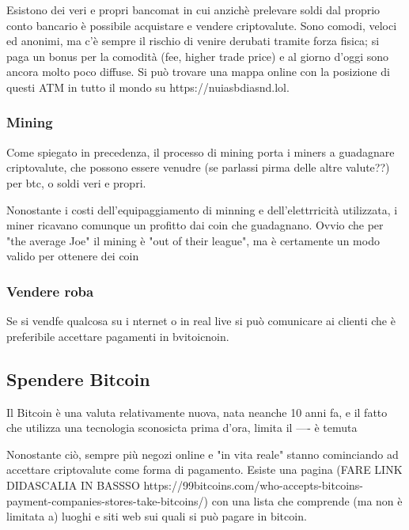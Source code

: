 \documentclass {article}
\begin{document}
Esistono dei veri e propri bancomat in cui anzichè prelevare soldi dal proprio conto bancario è possibile acquistare e vendere criptovalute. Sono comodi, veloci ed anonimi, ma c'è sempre il rischio di venire derubati tramite forza fisica; si paga un bonus per la comodità (fee, higher trade price) e al giorno d'oggi sono ancora molto poco diffuse. Si può trovare una mappa online con la posizione di questi ATM in tutto il mondo su https://nuiasbdiasnd.lol.



\subsubsection {Mining}



Come spiegato in precedenza, il processo di mining porta i miners a guadagnare criptovalute, che possono essere venudre (se parlassi pirma delle altre valute??) per btc, o soldi veri e propri.

Nonostante i costi dell'equipaggiamento di minning e dell'elettrricità utilizzata, i miner ricavano comunque un profitto dai coin che guadagnano. Ovvio che per "the average Joe" il mining è "out of their league", ma è certamente un modo valido per ottenere dei coin



\subsubsection {Vendere roba}



Se si vendfe qualcosa su i nternet o in real live si può comunicare ai clienti che è preferibile accettare pagamenti in bvitoicnoin.



\subsection {Spendere Bitcoin}



Il Bitcoin è una valuta relativamente nuova, nata neanche 10 anni fa, e il fatto che utilizza una tecnologia sconosicta prima d'ora, limita il ---- è temuta

Nonostante ciò, sempre più negozi online e "in vita reale" stanno cominciando ad accettare criptovalute come forma di pagamento. Esiste una pagina (FARE LINK DIDASCALIA IN BASSSO https://99bitcoins.com/who-accepts-bitcoins-payment-companies-stores-take-bitcoins/) con una lista che comprende (ma non è limitata a) luoghi e siti web sui quali si può pagare in bitcoin.
\end{document}
